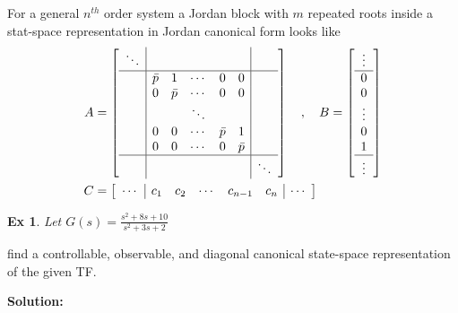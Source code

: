 \documentclass[twoside]{article}
\newtheorem{exmp}[theorem]{Ex}
\begin{document}
For a general $n^{th}$ order system a Jordan block 
with $m$ repeated roots inside a stat-space representation
in Jordan canonical form looks like
%
\begin{align*}
A &= \left[ \begin{array}{c|ccccc|c} 
\ddots & & & & & &
\\ \hline
& \bar{p} & 1 & \cdots & 0 & 0 & 
\\ & 0 & \bar{p} & \cdots & 0 & 0
\\ & & & \ddots & & & 
\\ & 0 & 0 & \cdots & \bar{p} & 1
    \\ & 0 & 0 & \cdots & 0 & \bar{p}
\\
\hline
& & & & & & \ddots
 \end{array} \right]
\quad , \quad 
B = \left[ \begin{array}{c} \vdots \\\hline 
0 \\ 0 \\ \vdots \\ 0 \\  1 \\ \hline
\vdots
\end{array} \right]
\\ C &= \left[ \begin{array}{c|ccccc|c} \cdots & 
c_1 & c_2 & \cdots &  c_{n-1} & c_n & \cdots\end{array} \right]
\end{align*}
%

\begin{exmp}
Let $G(s) = \frac{s^2 + 8 s + 10}{s^2 + 3 s + 2}$
\end{exmp}
%
find a controllable, observable, and  diagonal canonical state-space representation of the given TF.

\vspace{6pt}

\textbf{Solution:}
\end{document}
